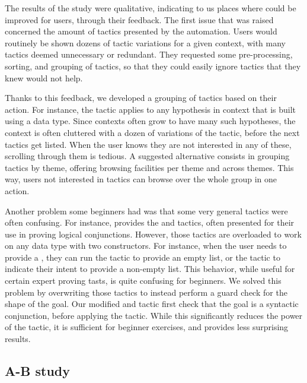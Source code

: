 The results of the study were qualitative, indicating to us places where
\PeaCoq{} could be improved for users, through their feedback.  The first issue
that was raised concerned the amount of tactics presented by the automation.
Users would routinely be shown dozens of tactic variations for a given context,
with many tactics deemed unnecessary or redundant.  They requested some
pre-processing, sorting, and grouping of tactics, so that they could easily
ignore tactics that they knew would not help.

Thanks to this feedback, we developed a grouping of tactics based on their
action.  For instance, the  tactic applies to any hypothesis
in context that is built using a data type.  Since contexts often grow to have
many such hypotheses, the context is often cluttered with a dozen of variations
of the  tactic, before the next tactics get listed.  When
the user knows they are not interested in any of these, scrolling through them
is tedious.  A suggested alternative consists in grouping tactics by theme,
offering browsing facilities per theme and across themes.  This way, users not
interested in  tactics can browse over the whole group in
one action.

Another problem some beginners had was that some very general tactics were often
confusing.  For instance, \Coq{} provides the  and
 tactics, often presented for their use in proving logical
conjunctions.  However, those tactics are overloaded to work on any data type
with two constructors.  For instance, when the user needs to provide a
, they can run the  tactic to provide an empty
list, or the  tactic to indicate their intent to provide a
non-empty list.  This behavior, while useful for certain expert proving tasts,
is quite confusing for beginners.  We solved this problem by overwriting those
tactics to instead perform a guard check for the shape of the goal.  Our
modified  and  tactic first check that the goal
is a syntactic conjunction, before applying the tactic.  While this
significantly reduces the power of the tactic, it is sufficient for beginner
exercises, and provides less surprising results.

\subsection{A-B study}~\label{peacoq-a-b-study}

